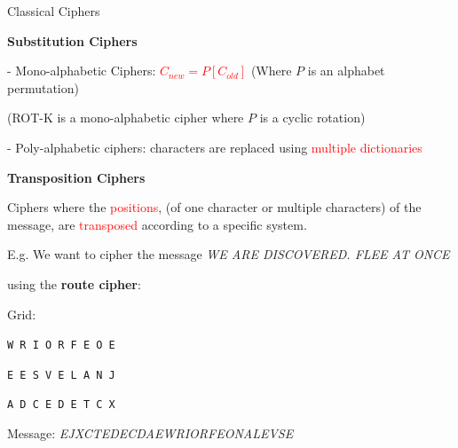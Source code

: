 \documentclass[handout, xcolor=dvipsnames,aspectratio=169]{beamer}
\begin{document}
\begin{frame}{Classical Ciphers}

  \textbf{Substitution Ciphers}

  \phantom{pad}- Mono-alphabetic Ciphers: \textcolor{red}{$C_{new} = P[C_{old}]$} (Where $P$ is an alphabet permutation)

  \smallskip

  \phantom{pad}(ROT-K is a mono-alphabetic cipher where $ P $ is a cyclic rotation)

  \smallskip

  \phantom{pad}- Poly-alphabetic ciphers: characters are replaced using \textcolor{red}{multiple dictionaries}

  \smallskip

  \textbf{Transposition Ciphers}

  \phantom{pad}Ciphers where the \textcolor{red}{positions}, (of one character or multiple characters) of the message, are \textcolor{red}{transposed} according to a specific system.

  \smallskip

  E.g. We want to cipher the message \textit{WE ARE DISCOVERED. FLEE AT ONCE}

  using the \textbf{route cipher}:

  Grid:

  \centerline{\texttt{W R I O R F E O E}}
  \centerline{\texttt{E E S V E L A N J}}
  \centerline{\texttt{A D C E D E T C X}}

  Message: \textit{EJXCTEDECDAEWRIORFEONALEVSE}

\end{frame}
\end{document}
